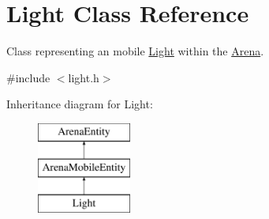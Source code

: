 \hypertarget{class_light}{}\section{Light Class Reference}
\label{class_light}


Class representing an mobile \mbox{\hyperlink{class_light}{Light}} within the \mbox{\hyperlink{class_arena}{Arena}}.  




{\ttfamily \#include $<$light.\+h$>$}

Inheritance diagram for Light\+:\begin{figure}[H]
\begin{center}
\leavevmode
\includegraphics[height=3.000000cm]{class_light}
\end{center}
\end{figure}
